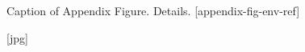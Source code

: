 
\begin{wrtxFigEnv}[H][width=0.6\linewidth]
    {Caption of Appendix Figure.}%
    {Details.}%
    [appendix-fig-env-ref]


    [jpg]

\end{wrtxFigEnv}